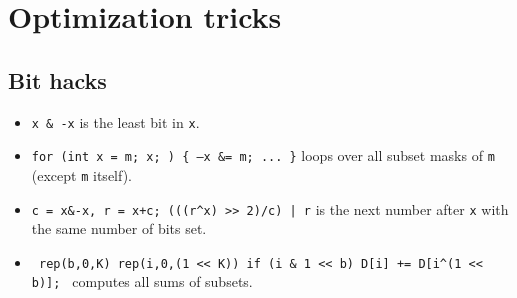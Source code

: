 \section{Optimization tricks}
\subsection{Bit hacks}
\begin{itemize}
	\item \texttt{x \& -x} is the least bit in \texttt{x}.
	\item \texttt{for (int x = m; x; ) \{ --x \&= m; ... \}} loops over all subset masks of \texttt{m} (except \texttt{m} itself).
	\item \texttt{c = x\&-x, r = x+c; (((r\^{}x) >> 2)/c) | r} is the next number after \texttt{x} with the same number of bits set.
	\item \texttt{ rep(b,0,K) rep(i,0,(1 << K)) if (i \& 1 << b) D[i] += D[i\^{}(1 << b)]; } computes all sums of subsets.
\end{itemize}
